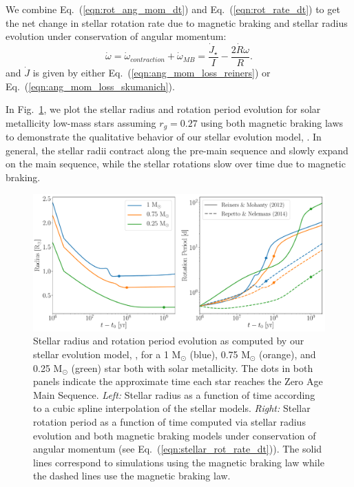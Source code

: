 We combine Eq.~(\ref{eqn:rot_ang_mom_dt}) and Eq.~(\ref{eqn:rot_rate_dt}) to get the net change in stellar rotation rate due to magnetic braking and stellar radius evolution under conservation of angular momentum:
\begin{equation} \label{eqn:stellar_rot_rate_dt}
\dot{\omega} = \dot{\omega}_{contraction} + \dot{\omega}_{MB} = \frac{\dot{J}_{\star}}{I} - \frac{2 \dot{R} \omega}{R}.
\end{equation}
and $\dot{J}$ is given by either Eq.~(\ref{eqn:ang_mom_loss_reiners}) or Eq.~(\ref{eqn:ang_mom_loss_skumanich}).

In Fig.~\ref{fig:stellar_example}, we plot the stellar radius and rotation period evolution for solar metallicity low-mass stars assuming $r_g = 0.27$ using both magnetic braking laws to demonstrate the qualitative behavior of our stellar evolution model, \stellar.  In general, the stellar radii contract along the pre-main sequence and slowly expand on the main sequence, while the stellar rotations slow over time due to magnetic braking.  


\begin{figure}
	\includegraphics[width=\columnwidth]{stellar_example.pdf}
    \caption{Stellar radius and rotation period evolution as computed by our stellar evolution model, \stellar, for a 1 M$_{\odot}$ (blue), 0.75 M$_{\odot}$ (orange), and 0.25 M$_{\odot}$ (green) star both with solar metallicity. The dots in both panels indicate the approximate time each star reaches the Zero Age Main Sequence.  {\it Left:} Stellar radius as a function of time according to a cubic spline interpolation of the \citet{Baraffe2015} stellar models.  {\it Right:} Stellar rotation period as a function of time computed via stellar radius evolution and both magnetic braking models under conservation of angular momentum (see Eq.~(\ref{eqn:stellar_rot_rate_dt})).  The solid lines correspond to simulations using the \citet{Reiners2012} magnetic braking law while the dashed lines use the \citet{Repetto2014} magnetic braking law.}
    \label{fig:stellar_example}
\end{figure}

